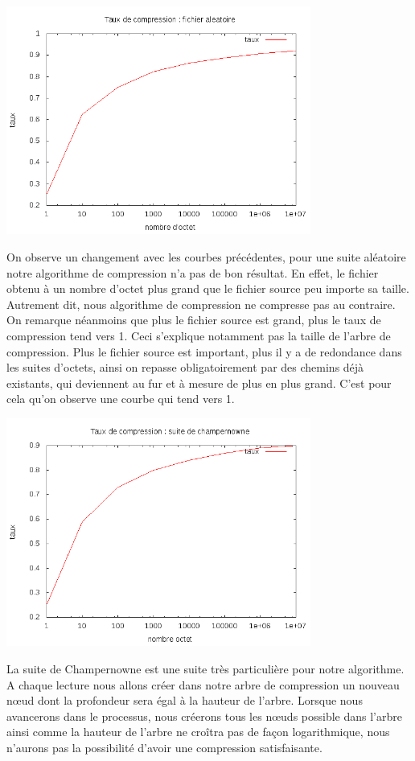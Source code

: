 \documentclass{report}
\begin{document}
\begin{center}
\includegraphics[width=10cm]{LZAleatoire.png}
\end{center}

On observe un changement avec les courbes précédentes, pour une suite aléatoire notre algorithme de compression n'a pas de bon résultat. En effet, le fichier obtenu à un nombre d'octet plus grand que le fichier source peu importe sa taille. Autrement dit, nous algorithme de compression ne compresse pas au contraire. 
On remarque néanmoins que plus le fichier source est grand, plus le taux de compression tend vers 1. Ceci s'explique notamment pas la taille de l'arbre de compression. Plus le fichier source est important, plus il y a de redondance dans les suites d'octets, ainsi on repasse obligatoirement par des chemins déjà existants, qui deviennent au fur et à mesure de plus en plus grand. 
C'est pour cela qu'on observe une courbe qui tend vers 1. 


\begin{center}
\includegraphics[width=10cm]{champLZ.png}
\end{center}
La suite de Champernowne est une suite très particulière pour notre algorithme. A chaque lecture nous allons créer dans notre arbre de compression un nouveau nœud dont la profondeur sera égal à la hauteur de l'arbre. Lorsque nous avancerons dans le processus, nous créerons tous les nœuds possible dans l'arbre ainsi comme la hauteur de l'arbre ne croîtra pas de façon logarithmique, nous n'aurons pas la possibilité d'avoir une compression satisfaisante. 
\newpage
\end{document}
